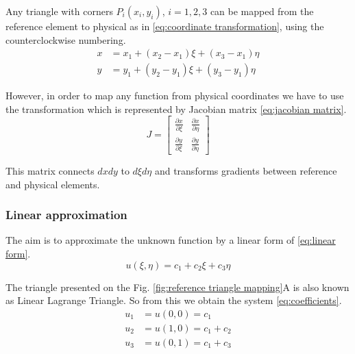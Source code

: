 \documentclass[conference]{IEEEtran}
\begin{document}
Any triangle with corners $P_i(x_i, y_i)$, $i = 1, 2, 3$ can be mapped from the reference element to physical as in \ref{eq:coordinate transformation}, using the counterclockwise numbering.
\begin{equation}
\begin{aligned}
    x &= x_1 + (x_2 - x_1)\xi + (x_3 - x_1)\eta \\
    y &= y_1 + (y_2 - y_1)\xi + (y_3 - y_1)\eta
    \label{eq:coordinate transformation}
\end{aligned}
\end{equation}

However, in order to map any function from physical coordinates we have to use the transformation which is represented by Jacobian matrix \ref{eq:jacobian matrix}.
\begin{equation}
    J = \begin{bmatrix}
        \frac{\partial x}{\partial \xi} & \frac{\partial x}{\partial \eta} \\
        \frac{\partial y}{\partial \xi} & \frac{\partial y}{\partial \eta} 
    \end{bmatrix}
    \label{eq:jacobian matrix}
\end{equation}

This matrix connects $dxdy$ to $d\xi d\eta$ and transforms gradients between reference and physical elements.


\subsubsection{Linear approximation} \label{sub:linear approximation}
The aim is to approximate the unknown function by a linear form of \ref{eq:linear form}. 
\begin{equation}
    u(\xi, \eta) = c_1 + c_2\xi + c_3\eta
    \label{eq:linear form}
\end{equation}

The triangle presented on the Fig. \ref{fig:reference triangle mapping}A is also known as Linear Lagrange Triangle.
So from this we obtain the system \ref{eq:coefficients}.
\begin{equation}
\begin{aligned}
    u_1 &= u(0, 0) = c_1 \\
    u_2 &= u(1, 0) = c_1 + c_2 \\
    u_3 &= u(0, 1) = c_1 + c_3
    \label{eq:coefficients}
\end{aligned}
\end{equation}
\end{document}
